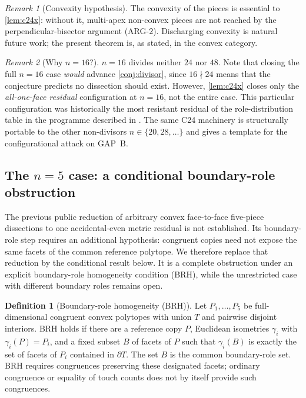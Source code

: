 \documentclass[11pt,a4paper]{article}
\theoremstyle{plain}
\theoremstyle{definition}
\newtheorem{definition}[definition]{Definition}
\theoremstyle{remark}
\newtheorem{remark}[remark]{Remark}
\begin{document}
\begin{remark}[Convexity hypothesis]
The convexity of the pieces is essential to \cref{lem:c24x}: without it,
multi-apex non-convex pieces are not reached by the perpendicular-bisector
argument (ARG-$2$).  Discharging convexity is natural future work; the
present theorem is, as stated, in the convex category.
\end{remark}

\begin{remark}[Why $n = 16$?]
$n = 16$ divides neither $24$ nor $48$.  Note that closing the full
$n = 16$ case \emph{would} advance \cref{conj:divisor}, since $16 \nmid 24$
means that the conjecture predicts no dissection should exist.
However, \cref{lem:c24x} closes only the \emph{all-one-face residual}
configuration at $n = 16$, not the entire case.  This particular
configuration was historically the most resistant residual of the
role-distribution table in the programme described in .
The same C24 machinery is structurally portable to the other
non-divisors $n \in \{20, 28, \ldots\}$ and gives a template for the
configurational attack on GAP~B.
\end{remark}

\subsection{The \texorpdfstring{$n=5$}{n=5} case: a conditional boundary-role obstruction}
\label{sec:prog-n5}

The previous public reduction of arbitrary convex face-to-face five-piece
dissections to one accidental-even metric residual is not established.  Its
boundary-role step requires an additional hypothesis: congruent copies need
not expose the same facets of the common reference polytope.  We therefore
replace that reduction by the conditional result below.  It is a complete
obstruction under an explicit boundary-role homogeneity condition (BRH),
while the unrestricted case with different boundary roles remains open.

\begin{definition}[Boundary-role homogeneity (BRH)]\label{def:brh}
Let $P_1,\ldots,P_5$ be full-dimensional congruent convex polytopes with
union $T$ and pairwise disjoint interiors.  BRH holds if there are a
reference copy $P$, Euclidean isometries $\gamma_i$ with
$\gamma_i(P)=P_i$, and a fixed subset $B$ of facets of $P$ such that
$\gamma_i(B)$ is exactly the set of facets of $P_i$ contained in
$\partial T$.  The set $B$ is the common boundary-role set.  BRH requires
congruences preserving these designated facets; ordinary congruence or
equality of touch counts does not by itself provide such congruences.
\end{definition}
\end{document}
